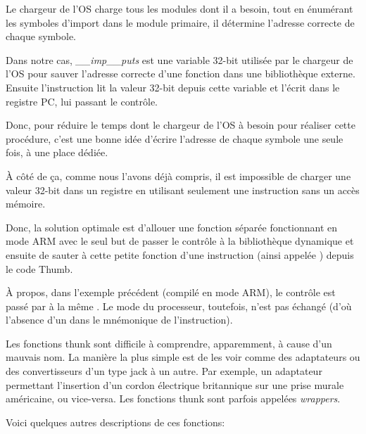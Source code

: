 Le chargeur de l'\ac{OS} charge tous les modules dont il a besoin, tout en énumérant
les symboles d'import dans le module primaire, il détermine l'adresse correcte de
chaque symbole.

Dans notre cas, \emph{\_\_imp\_\_puts} est une variable 32-bit utilisée par le
chargeur de l'\ac{OS} pour sauver l'adresse correcte d'une fonction dans une
bibliothèque externe.
Ensuite l'instruction  lit la valeur 32-bit depuis cette variable et
l'écrit dans le registre \ac{PC}, lui passant le contrôle.

Donc, pour réduire le temps dont le chargeur de l'\ac{OS} à besoin pour réaliser
cette procédure, c'est une bonne idée d'écrire l'adresse de chaque symbole une
seule fois, à une place dédiée.


À côté de ça, comme nous l'avons déjà compris, il est impossible de charger
une valeur 32-bit dans un registre en utilisant seulement une instruction
sans un accès mémoire.

Donc, la solution optimale est d'allouer une fonction séparée fonctionnant en
mode ARM avec le seul but de passer le contrôle à la bibliothèque dynamique et
ensuite de sauter à cette petite fonction d'une instruction (ainsi appelée
) depuis le code Thumb.

À propos, dans l'exemple précédent (compilé en mode ARM), le contrôle est
passé par  à la même .
Le mode du processeur, toutefois, n'est pas échangé (d'où l'absence d'un 
dans le mnémonique de l'instruction).


Les fonctions thunk sont difficile à comprendre, apparemment, à cause d'un
mauvais nom.
La manière la plus simple est de les voir comme des adaptateurs ou des
convertisseurs d'un type jack à un autre.
Par exemple, un adaptateur permettant l'insertion d'un cordon électrique
britannique sur une prise murale américaine, ou vice-versa.
Les fonctions thunk sont parfois appelées \emph{wrappers}.

Voici quelques autres descriptions de ces fonctions:

